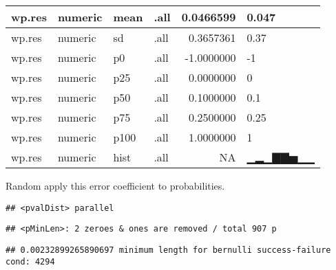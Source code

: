 \documentclass[]{article}
\newenvironment{Shaded}{\begin{snugshade}}{\end{snugshade}}
\newcommand{\ControlFlowTok}[1]{\textcolor[rgb]{0.13,0.29,0.53}{\textbf{#1}}}
\newcommand{\DataTypeTok}[1]{\textcolor[rgb]{0.13,0.29,0.53}{#1}}
\newcommand{\DecValTok}[1]{\textcolor[rgb]{0.00,0.00,0.81}{#1}}
\newcommand{\KeywordTok}[1]{\textcolor[rgb]{0.13,0.29,0.53}{\textbf{#1}}}
\newcommand{\NormalTok}[1]{#1}
\newcommand{\OperatorTok}[1]{\textcolor[rgb]{0.81,0.36,0.00}{\textbf{#1}}}
\newcommand{\OtherTok}[1]{\textcolor[rgb]{0.56,0.35,0.01}{#1}}
\newcommand{\StringTok}[1]{\textcolor[rgb]{0.31,0.60,0.02}{#1}}
\begin{document}
\begin{tabular}{l|l|l|l|r|l}
\hline
wp.res & numeric & mean & .all & 0.0466599 & 0.047\\
\hline
wp.res & numeric & sd & .all & 0.3657361 & 0.37\\
\hline
wp.res & numeric & p0 & .all & -1.0000000 & -1\\
\hline
wp.res & numeric & p25 & .all & 0.0000000 & 0\\
\hline
wp.res & numeric & p50 & .all & 0.1000000 & 0.1\\
\hline
wp.res & numeric & p75 & .all & 0.2500000 & 0.25\\
\hline
wp.res & numeric & p100 & .all & 1.0000000 & 1\\
\hline
wp.res & numeric & hist & .all & NA & ▁▂▁▇▇▅▁▁\\
\hline
\end{tabular}

Random apply this error coefficient to probabilities.

\begin{Shaded}
\end{Shaded}

\begin{verbatim}
## <pvalDist> parallel
\end{verbatim}

\begin{verbatim}
## <pMinLen>: 2 zeroes & ones are removed / total 907 p
\end{verbatim}

\begin{verbatim}
## 0.00232899265890697 minimum length for bernulli success-failure cond: 4294
\end{verbatim}
\end{document}
